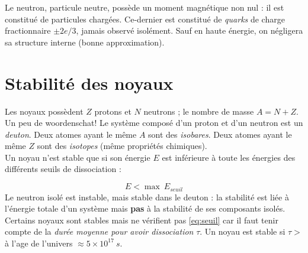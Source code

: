 \documentclass	[11pt, a4paper, openany]{book}
\begin{document}
		Le neutron, particule neutre, possède un moment magnétique non nul : il est constitué de particules
		chargées. Ce-dernier est constitué de \textit{quarks} de charge fractionnaire $\pm 2e/3$, jamais 
		observé isolément. Sauf en haute énergie, on négligera sa structure interne (bonne approximation).
		
		\section{Stabilité des noyaux}
		Les noyaux possèdent $Z$ protons et $N$ neutrons ; le nombre de masse $A = N + Z$. Un peu de 
		woordenschat! Le système composé d'un proton et d'un neutron est un \textit{deuton}. Deux atomes ayant le même 
		$A$ sont des \textit{isobares}. Deux atomes ayant le même $Z$ sont des \textit{isotopes} (même 
		propriétés chimiques).\\
		Un noyau n'est stable que si son énergie $E$ est inférieure à toute les énergies des différents 
		seuils de dissociation : 
		
		\begin{equation}
			E < \max\ E_{seuil}
			\label{eq:seuil}
		\end{equation}
		Le neutron isolé est instable, mais stable dans le deuton : la stabilité est liée à l'énergie 
		totale d'un système mais \textbf{pas} à la stabilité de ses composants isolés. \\
		Certains noyaux sont stables mais ne vérifient pas \autoref{eq:seuil} car il faut tenir compte 
		de la \textit{durée moyenne pour avoir dissociation} $\tau$. Un noyau est stable si $\tau >$ à
		l'age de l'univers $\approx 5\times10^{17}\ s$.
		
		
\end{document}
